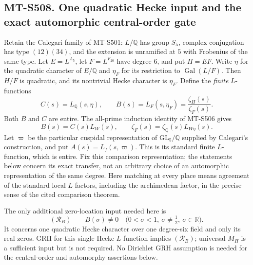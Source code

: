 \subsection*{MT-S508. One quadratic Hecke input and the exact automorphic central-order gate}

Retain the Calegari family of MT-S501: $L/\mathbb Q$ has group
$S_5$, complex conjugation has type $(12)(34)$, and the extension
is unramified at $5$ with Frobenius of the same type.  Let
$E=L^{A_5}$, let $F=L^{F_{20}}$ have degree $6$, and put $H=EF$.
Write $\eta$ for the quadratic character of $E/\mathbb Q$ and
$\eta_F$ for its restriction to $\operatorname{Gal}(L/F)$.
Then $H/F$ is quadratic, and its nontrivial Hecke character is
$\eta_F$.  Define the \emph{finite} $L$-functions
\[
 C(s)=L_{\mathbb Q}(s,\eta),\qquad
 B(s)=L_F(s,\eta_F)=\frac{\zeta_H(s)}{\zeta_F(s)}.
 \tag{S508.1}
\]
Both $B$ and $C$ are entire.  The all-prime induction identity
of MT-S506 gives
\[
             B(s)=C(s)L_W(s),\qquad
             \zeta_F(s)=\zeta_{\mathbb Q}(s)L_{W\eta}(s).
 \tag{S508.2}
\]
Let $\varpi$ be the particular cuspidal representation of
$\mathrm{GL}_5/\mathbb Q$ supplied by Calegari's construction,
and put $A(s)=L_f(s,\varpi)$.  This is its standard finite
$L$-function, which is entire.  Fix this comparison representation;
the statements below concern its exact transfer, not an arbitrary
choice of an automorphic representation of the same degree.
Here matching at every place means agreement of the standard
local $L$-factors, including the archimedean factor, in the
precise sense of the cited comparison theorem.

The only additional zero-location input needed here is
\[
  (\mathcal R_B)\qquad
  B(\sigma)\ne0\quad
  \bigl(0<\sigma<1,\ \sigma\ne\tfrac12,\ \sigma\in\mathbb R\bigr).
 \tag{S508.3}
\]
It concerns one quadratic Hecke character over one degree-six
field and only its real zeros.  GRH for this single Hecke
$L$-function implies $(\mathcal R_B)$; universal $M_H$ is a
sufficient input but is not required.  No Dirichlet GRH assumption
is needed for the central-order and automorphy assertions below.

